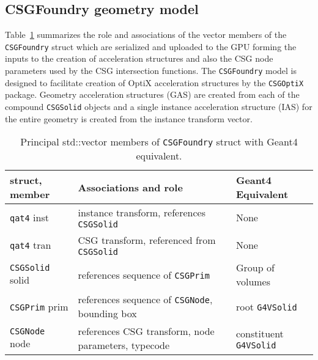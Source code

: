 \documentclass{webofc}
\begin{document}
\subsection{CSGFoundry geometry model}
%
Table~\ref{tabcsgfoundry} summarizes the role and associations of the vector members 
of the {\tt CSGFoundry} struct which are serialized and uploaded to the GPU 
forming the inputs to the creation of acceleration structures and also the CSG node 
parameters used by the CSG intersection functions. 
%
The {\tt CSGFoundry} model is designed to facilitate creation 
of OptiX acceleration structures by the {\tt CSGOptiX} package. 
Geometry acceleration structures (GAS) are created from each of the 
compound {\tt CSGSolid} objects and a single instance acceleration structure (IAS)
for the entire geometry is created from the instance transform vector. 
%
%
%
\begin{center}
\begin{table}
\begin{tabular}{ |m{22mm}|m{80mm}|m{16mm}| } 
 \hline
 struct, member        & Associations and role                                                          & Geant4 Equivalent   \\
\hline\hline 
 {\tt qat4} inst       & instance transform, references {\tt CSGSolid}                                  &  None               \\
\hline 
 {\tt qat4} tran       & CSG transform, referenced from {\tt CSGSolid}                                  &  None               \\
\hline 
 {\tt CSGSolid} solid  & references sequence of {\tt CSGPrim}                                           & Group of volumes      \\ 
\hline 
 {\tt CSGPrim} prim    & references sequence of {\tt CSGNode}, bounding box                             & root {\tt G4VSolid} \\
\hline 
 {\tt CSGNode} node    & references CSG transform, node parameters, typecode                            & constituent {\tt G4VSolid} \\
 \hline
\end{tabular}
\caption{\label{tabcsgfoundry}Principal std::vector members of {\tt CSGFoundry} struct with Geant4 equivalent. }
\end{table}
\end{center}
%
%
\end{document}
